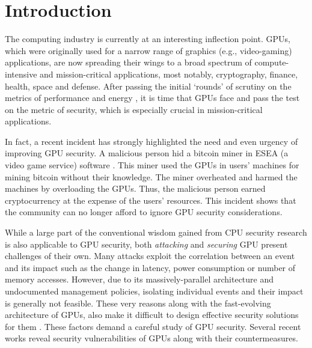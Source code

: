 \section{Introduction}\label{sec:introduction}

The computing industry is currently at an interesting inflection point. GPUs, which were originally used for a narrow range of graphics (e.g., video-gaming) applications, are now spreading their wings to a broad spectrum of compute-intensive and mission-critical applications, most notably, cryptography, finance, health, space and defense. After passing the initial `rounds'   of scrutiny on the metrics of performance and energy \cite{mittal2015gpupowermgmtsurvey,mittal2015cpugpusurvey},  it is time that GPUs face and pass the test on the metric of security, which is especially crucial in mission-critical applications.

In fact, a recent incident has strongly highlighted the need and even urgency of  improving GPU security. A malicious person hid a bitcoin miner in ESEA (a video game service) software \cite{eseaBitCoin}. This miner used the GPUs in users' machines for mining bitcoin without their knowledge. The miner overheated and harmed the machines by overloading the GPUs. Thus, the malicious person earned cryptocurrency at the expense of the users' resources. This incident shows that the community can no longer afford to ignore GPU security considerations. 

While a large part of the conventional wisdom gained from CPU security research is also applicable to GPU security, both \textit{attacking} and \textit{securing} GPU present challenges of their own. Many attacks exploit the correlation between an event and its impact such as the change in latency, power consumption or number of memory accesses. However, due to its massively-parallel architecture and undocumented management policies, isolating individual events and their impact is generally not feasible. These very reasons along with the fast-evolving architecture of GPUs, also make it difficult to design effective security solutions for them \cite{zhu2017understanding}. These factors demand a careful study of GPU security. Several recent works reveal security vulnerabilities of GPUs along with their countermeasures. 


